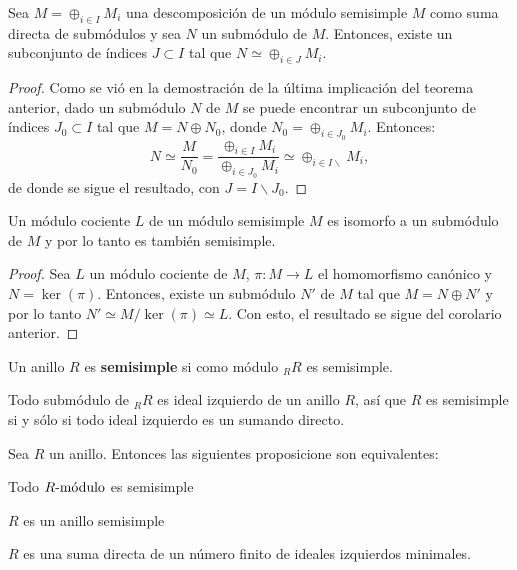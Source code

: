 \begin{corolario}
Sea $M = \oplus_{i \in I}M_i$ una descomposición de un módulo semisimple $M$ como suma directa de submódulos y sea $N$ un submódulo de $M$. Entonces, existe un subconjunto de índices $J \subset I $ tal que $N \simeq \oplus_{i \in J}M_i$.
\end{corolario}
\begin{proof}
Como se vió en la demostración de la última implicación del teorema anterior, dado un submódulo $N$ de $M$ se puede encontrar un subconjunto de índices $J_0 \subset I$  tal que $M = N \oplus N_0$, donde $N_0 = \oplus_{i \in J_0}M_i$. Entonces:
\[ N \simeq \frac{M}{N_0} = \frac{\oplus_{i \in I}M_i}{\oplus_{i \in J_0}M_i} \simeq \oplus_{i \in I \backslash} M_i, \] de donde se sigue el resultado, con $J = I \backslash J_0$.
\end{proof}
\begin{corolario}
Un módulo cociente $L$ de un módulo semisimple $M$ es isomorfo a un submódulo de $M$ y por lo tanto es también semisimple.
\end{corolario}
\begin{proof}
Sea $L$ un módulo cociente de $M$, $\pi \colon M \to L$ el homomorfismo canónico y $N = \ker(\pi)$. Entonces, existe un submódulo $N'$ de $M$ tal que $M = N \oplus N'$ y por lo tanto $N'\simeq M/\ker(\pi) \simeq L$. Con esto, el resultado se sigue del corolario anterior.
\end{proof}
\begin{definicion}
Un anillo $R$ es \textbf{semisimple} si como módulo $_RR$ es semisimple. 
\end{definicion}
Todo submódulo de $_RR$ es ideal izquierdo de un anillo $R$, así que $R$ es semisimple si y sólo si todo ideal izquierdo es un sumando directo.
\begin{teorema}
Sea $R$ un anillo. Entonces las siguientes proposicione son equivalentes:
\begin{bulletList}
\item\label{item:rssimple1} Todo $\modulo{R}$ es semisimple
\item\label{item:rssimple2} $R$ es un anillo semisimple
\item\label{item:rssimple3} $R$ es una suma directa de un número finito de ideales izquierdos minimales.
\end{bulletList}
\end{teorema}
